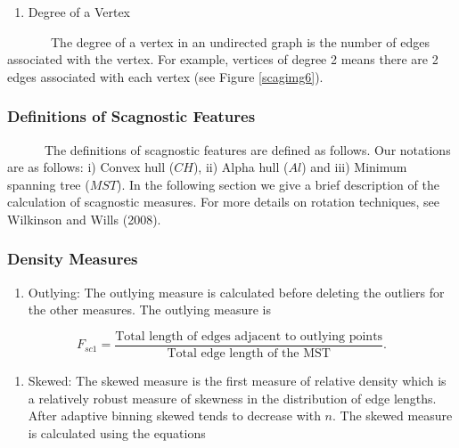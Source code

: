 \documentclass{article}
\begin{document}
\begin{enumerate}
\def\labelenumi{\roman{enumi})}
\setcounter{enumi}{2}
\tightlist
\item
  Degree of a Vertex
\end{enumerate}

~~~~~~~The degree of a vertex in an undirected graph is the number of
edges associated with the vertex. For example, vertices of degree 2
means there are 2 edges associated with each vertex (see Figure
\ref{scagimg6}).

\hypertarget{definitions-of-scagnostic-features}{%
\subsubsection{Definitions of Scagnostic
Features}\label{definitions-of-scagnostic-features}}

~~~~~~The definitions of scagnostic features are defined as follows. Our
notations are as follows: i) Convex hull (\(CH\)), ii) Alpha hull
(\(Al\)) and iii) Minimum spanning tree (\(MST\)). In the following
section we give a brief description of the calculation of scagnostic
measures. For more details on rotation techniques, see Wilkinson and
Wills (2008).

\hypertarget{density-measures}{%
\subsubsection{Density Measures}\label{density-measures}}

\begin{enumerate}
\def\labelenumi{\roman{enumi})}
\tightlist
\item
  Outlying: The outlying measure is calculated before deleting the
  outliers for the other measures. The outlying measure is
\end{enumerate}

\begin{equation}
      F_{sc1} = \frac{\text{Total length of edges adjacent to outlying points}}{\text{Total edge length of the MST}}.
\end{equation}

\begin{enumerate}
\def\labelenumi{\roman{enumi})}
\setcounter{enumi}{1}
\tightlist
\item
  Skewed: The skewed measure is the first measure of relative density
  which is a relatively robust measure of skewness in the distribution
  of edge lengths. After adaptive binning skewed tends to decrease with
  \(n\). The skewed measure is calculated using the equations
\end{enumerate}
\end{document}
